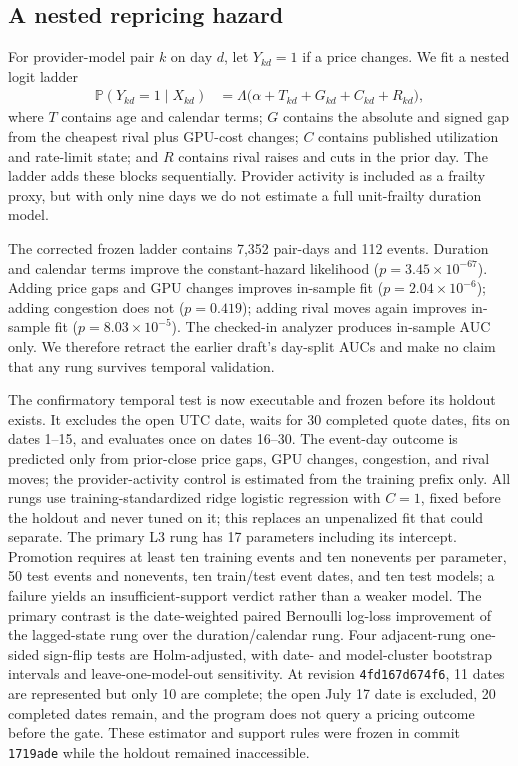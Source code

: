 \documentclass[11pt]{article}
\newcommand{\Prb}{\mathbb{P}}
\newcommand{\1}{\mathbf{1}}
\begin{document}
\subsection{A nested repricing hazard}

For provider-model pair $k$ on day $d$, let $Y_{kd}=1$ if a price changes.  We fit
a nested logit ladder
\begin{align}
 \Prb(Y_{kd}=1\mid X_{kd})
 &=\Lambda\big(\alpha + T_{kd}+G_{kd}+C_{kd}+R_{kd}\big), \label{eq:hazard}
\end{align}
where $T$ contains age and calendar terms; $G$ contains the absolute and signed
gap from the cheapest rival plus GPU-cost changes; $C$ contains published
utilization and rate-limit state; and $R$ contains rival raises and cuts in the
prior day.  The ladder adds these blocks sequentially.  Provider activity is
included as a frailty proxy, but with only nine days we do not estimate a full
unit-frailty duration model.

The corrected frozen ladder contains 7,352 pair-days and 112 events.  Duration
and calendar terms improve the constant-hazard likelihood
($p=3.45\times10^{-67}$).  Adding price gaps and GPU changes improves in-sample
fit ($p=2.04\times10^{-6}$); adding congestion does not ($p=0.419$); adding
rival moves again improves in-sample fit ($p=8.03\times10^{-5}$).  The checked-in
analyzer produces in-sample AUC only.  We therefore retract the earlier draft's
day-split AUCs and make no claim that any rung survives temporal validation.

The confirmatory temporal test is now executable and frozen before its holdout
exists.  It excludes the open UTC date, waits for 30 completed quote dates, fits
on dates 1--15, and evaluates once on dates 16--30.  The event-day outcome is
predicted only from prior-close price gaps, GPU changes, congestion, and rival
moves; the provider-activity control is estimated from the training prefix only.
All rungs use training-standardized ridge logistic regression with $C=1$, fixed
before the holdout and never tuned on it; this replaces an unpenalized fit that
could separate.  The primary L3 rung has 17 parameters including its intercept.
Promotion requires at least ten training events and ten nonevents per parameter,
50 test events and nonevents, ten train/test event dates, and ten test models;
a failure yields an insufficient-support verdict rather than a weaker model.
The primary contrast is the date-weighted paired Bernoulli log-loss improvement
of the lagged-state rung over the duration/calendar rung.  Four adjacent-rung
one-sided sign-flip tests are Holm-adjusted, with date- and model-cluster
bootstrap intervals and leave-one-model-out sensitivity.  At revision
\texttt{4fd167d674f6}, 11 dates are represented but only 10 are complete; the
open July 17 date is excluded, 20 completed dates remain, and the program does
not query a pricing outcome before the gate.  These estimator and support rules
were frozen in commit \texttt{1719ade} while the holdout remained inaccessible.
\end{document}
